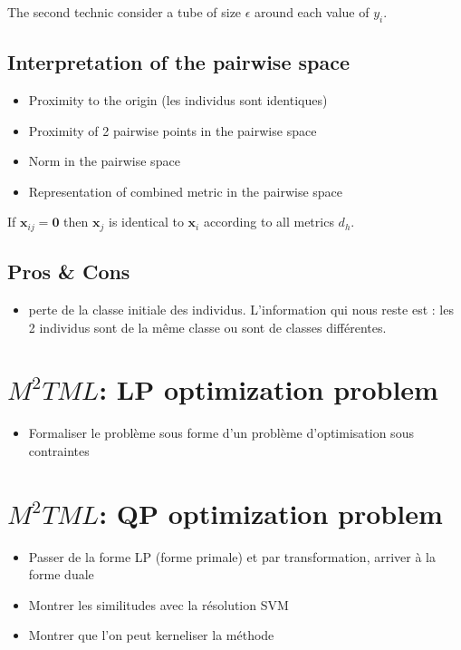 
\noindent The second technic consider a tube of size $\epsilon$ around each value of $y_i$.

\subsection{Interpretation of the pairwise space}
\begin{itemize}
	\item Proximity to the origin (les individus sont identiques)
	\item Proximity of 2 pairwise points in the pairwise space 
	\item Norm in the pairwise space
	\item Representation of combined metric in the pairwise space
\end{itemize}
If $\textbf{x}_{ij}=\textbf{0}$ then $\textbf{x}_{j}$ is identical to $\textbf{x}_{i}$ according to all metrics $d_h$.

\subsection{Pros \& Cons}
\begin{itemize}
	\item perte de la classe initiale des individus. L'information qui nous reste est : les 2 individus sont de la même classe ou sont de classes différentes.
\end{itemize}



\section{$M^2TML$: LP optimization problem}
\begin{itemize}
	\item Formaliser le problème sous forme d'un problème d'optimisation sous contraintes
\end{itemize}

\section{$M^2TML$: QP optimization problem}
\begin{itemize}
	\item Passer de la forme LP (forme primale) et par transformation, arriver à la forme duale
	\item Montrer les similitudes avec la résolution SVM
	\item Montrer que l'on peut kerneliser la méthode
\end{itemize}


